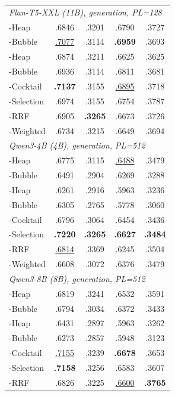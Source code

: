 \begin{table}[!htbp]
\begin{tabular}{l|cc|cc}
\multicolumn{5}{l}{\textit{Flan-T5-XXL (11B), generation, PL=128}} \\
\topdown{}-Heap & .6846 & .3201 & .6790 & .3727 \\
\topdown{}-Bubble & \underline{.7077} & .3114 & \textbf{.6959} & .3693 \\
\bottomup{}-Heap & .6874 & .3211 & .6625 & .3625 \\
\bottomup{}-Bubble & .6936 & .3114 & .6811 & .3681 \\
\dualend{}-Cocktail & \textbf{.7137} & .3155 & \underline{.6895} & .3718 \\
\dualend{}-Selection & .6974 & .3155 & .6754 & .3787 \\
\bidir{}-RRF & .6905 & \textbf{.3265} & .6673 & .3726 \\
\bidir{}-Weighted & .6734 & .3215 & .6649 & .3694 \\
\midrule
\multicolumn{5}{l}{\textit{Qwen3-4B (4B), generation, PL=512}} \\
\topdown{}-Heap & .6775 & .3115 & \underline{.6488} & .3479 \\
\topdown{}-Bubble & .6491 & .2904 & .6269 & .3288 \\
\bottomup{}-Heap & .6261 & .2916 & .5963 & .3236 \\
\bottomup{}-Bubble & .6305 & .2765 & .5778 & .3060 \\
\dualend{}-Cocktail & .6796 & .3064 & .6454 & .3436 \\
\dualend{}-Selection & \textbf{.7220} & \textbf{.3265} & \textbf{.6627} & \textbf{.3484} \\
\bidir{}-RRF & \underline{.6814} & .3369 & .6245 & .3504 \\
\bidir{}-Weighted & .6608 & .3072 & .6376 & .3479 \\
\midrule
\multicolumn{5}{l}{\textit{Qwen3-8B (8B), generation, PL=512}} \\
\topdown{}-Heap & .6819 & .3241 & .6532 & .3591 \\
\topdown{}-Bubble & .6794 & .3034 & .6372 & .3433 \\
\bottomup{}-Heap & .6431 & .2897 & .5963 & .3262 \\
\bottomup{}-Bubble & .6273 & .2857 & .5948 & .3123 \\
\dualend{}-Cocktail & \underline{.7155} & .3239 & \textbf{.6678} & .3653 \\
\dualend{}-Selection & \textbf{.7158} & .3256 & .6583 & .3607 \\
\bidir{}-RRF & .6826 & .3225 & \underline{.6600} & \textbf{.3765} \\

\end{tabular}
\end{table}
